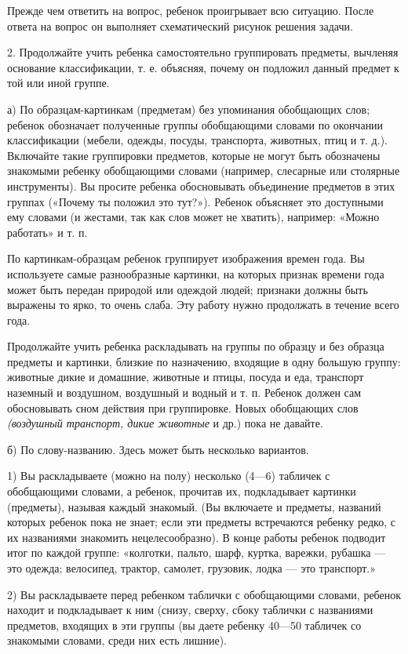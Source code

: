 \documentclass{book}
\renewcommand{\emph}[1]{\textit{#1}}
\begin{document}
Прежде чем ответить на вопрос, ребенок проигрывает всю ситуацию. После
ответа на вопрос он выполняет схематический рисунок решения задачи.

2. Продолжайте учить ребенка самостоятельно группировать предметы,
вычленяя основание классификации, т. е. объясняя, почему он подложил
данный предмет к той или иной группе.

а) По образцам-картинкам (предметам) без упоминания обобщающих слов;
ребенок обозначает полученные группы обобщающими словами по окончании
классификации (мебели, одежды, посуды, транспорта, животных, птиц и т.
д.). Включайте такие группировки предметов, которые не могут быть
обозначены знакомыми ребенку обобщающими словами (например, слесарные
или столярные инструменты). Вы просите ребенка обосновывать объединение
предметов в этих группах («Почему ты положил это тут?»). Ребенок
объясняет это доступными ему словами (и жестами, так как слов может не
хватить), например: «Можно работать» и т. п.

По картинкам-образцам ребенок группирует изображения времен года. Вы
используете самые разнообразные картинки, на которых признак времени
года может быть передан природой или одеждой людей; признаки должны быть
выражены то ярко, то очень слаба. Эту работу нужно продолжать в течение
всего года.

Продолжайте учить ребенка раскладывать на группы по образцу и без
образца предметы и картинки, близкие по назначению, входящие в одну
большую группу: животные дикие и домашние, животные и птицы, посуда и
еда, транспорт наземный и воздушном, воздушный и водный и т. п. Ребенок
должен сам обосновывать сном действия при группировке. Новых обобщающих
слов \emph{(воздушный транспорт, дикие животные} и др.) пока не давайте.

б) По слову-названию. Здесь может быть несколько вариантов.

1) Вы раскладываете (можно на полу) несколько (4---6) табличек с
обобщающими словами, а ребенок, прочитав их, подкладывает картинки
(предметы), называя каждый знакомый. (Вы включаете и предметы, названий
которых ребенок пока не знает; если эти предметы встречаются ребенку
редко, с их названиями знакомить нецелесообразно). В конце работы
ребенок подводит итог по каждой группе: «колготки, пальто, шарф, куртка,
варежки, рубашка --- это одежда; велосипед, трактор, самолет, грузовик,
лодка --- это транспорт.»

2) Вы раскладываете перед ребенком таблички с обобщающими словами,
ребенок находит и подкладывает к ним (снизу, сверху, сбоку таблички с
названиями предметов, входящих в эти группы (вы даете ребенку 40---50
табличек со знакомыми словами, среди них есть лишние).
\end{document}
